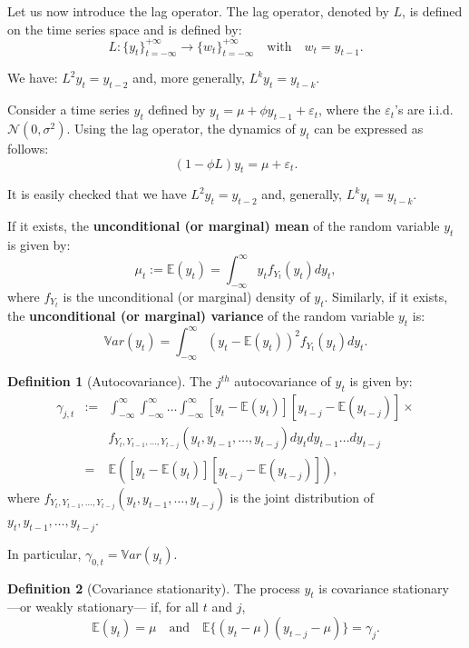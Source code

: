 \documentclass[
  12pt,
]{book}
\theoremstyle{definition}
\newtheorem{definition}{Definition}[chapter]
\theoremstyle{definition}
\theoremstyle{definition}
\theoremstyle{definition}
\theoremstyle{remark}
\begin{document}
Let us now introduce the lag operator. The lag operator, denoted by \(L\), is defined on the time series space and is defined by:
\begin{equation}
L: \{y_t\}_{t=-\infty}^{+\infty} \rightarrow \{w_t\}_{t=-\infty}^{+\infty} \quad \mbox{with} \quad w_t = y_{t-1}.\label{eq:lagOp}
\end{equation}

We have: \(L^2 y_t = y_{t-2}\) and, more generally, \(L^k y_t = y_{t-k}\).

Consider a time series \(y_t\) defined by \(y_t = \mu + \phi y_{t-1} + \varepsilon_t\), where the \(\varepsilon_t\)'s are i.i.d. \(\mathcal{N}(0,\sigma^2)\). Using the lag operator, the dynamics of \(y_t\) can be expressed as follows:
\[
(1-\phi L) y_t = \mu + \varepsilon_t.
\]

It is easily checked that we have \(L^2 y_t = y_{t-2}\) and, generally, \(L^k y_t = y_{t-k}\).

If it exists, the \textbf{unconditional (or marginal) mean} of the random variable \(y_t\) is given by:
\[
\mu_t := \mathbb{E}(y_t) = \int_{-\infty}^{\infty} y_t f_{Y_t}(y_t) dy_t,
\]
where \(f_{Y_t}\) is the unconditional (or marginal) density of \(y_t\). Similarly, if it exists, the \textbf{unconditional (or marginal) variance} of the random variable \(y_t\) is:
\[
\mathbb{V}ar(y_t) = \int_{-\infty}^{\infty} (y_t - \mathbb{E}(y_t))^2 f_{Y_t}(y_t) dy_t.
\]

\begin{definition}[Autocovariance]
\protect\hypertarget{def:autocov}{}\label{def:autocov}The \(j^{th}\) autocovariance of \(y_t\) is given by:
\begin{eqnarray*}
\gamma_{j,t} &:=& \int_{-\infty}^{\infty} \int_{-\infty}^{\infty} \dots \int_{-\infty}^{\infty} [y_t - \mathbb{E}(y_t)][y_{t-j} - \mathbb{E}(y_{t-j})] \times\\
&& f_{Y_t,Y_{t-1},\dots,Y_{t-j}}(y_t,y_{t-1},\dots,y_{t-j}) dy_t dy_{t-1} \dots dy_{t-j} \\
&=& \mathbb{E}([y_t - \mathbb{E}(y_t)][y_{t-j} - \mathbb{E}(y_{t-j})]),
\end{eqnarray*}
where \(f_{Y_t,Y_{t-1},\dots,Y_{t-j}}(y_t,y_{t-1},\dots,y_{t-j})\) is the joint distribution of \(y_t,y_{t-1},\dots,y_{t-j}\).
\end{definition}

In particular, \(\gamma_{0,t} = \mathbb{V}ar(y_t)\).

\begin{definition}[Covariance stationarity]
\protect\hypertarget{def:covstat}{}\label{def:covstat}The process \(y_t\) is covariance stationary ---or weakly stationary--- if, for all \(t\) and \(j\),
\[
\mathbb{E}(y_t) = \mu \quad \mbox{and} \quad \mathbb{E}\{(y_t - \mu)(y_{t-j} - \mu)\} = \gamma_j.
\]
\end{definition}
\end{document}

